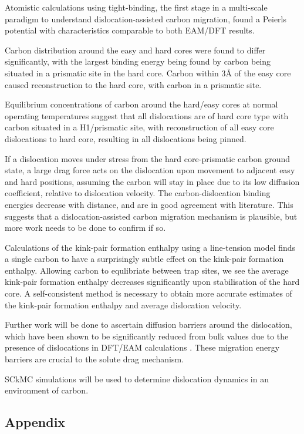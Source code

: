 \documentclass[a4paper,11pt]{article}
\numberwithin{equation}{chapter}
\numberwithin{listing}{chapter}
\begin{document}
Atomistic calculations using tight-binding, the first stage in a multi-scale paradigm to
understand dislocation-assisted carbon migration, found a Peierls potential with characteristics
comparable to both EAM/DFT results.

Carbon distribution around the easy and hard cores were found to differ
significantly, with the largest binding energy being found by carbon being situated in a prismatic
site in the hard core. Carbon within 3\AA{} of the easy core caused reconstruction to the hard core,
with carbon in a prismatic site.

Equilibrium concentrations of carbon around the hard/easy cores at normal operating temperatures
suggest that all dislocations are of hard core type with carbon situated in a H1/prismatic site, with
reconstruction of all easy core dislocations to hard core, resulting in all dislocations being
pinned.

If a dislocation moves under stress from the hard core-prismatic carbon ground state, a large drag
force acts on the dislocation upon movement to adjacent easy and hard positions, assuming the carbon
will stay in place due to its low diffusion coefficient, relative to dislocation velocity. The
carbon-dislocation binding energies decrease with distance, and are in good agreement with
literature. This suggests that a dislocation-assisted carbon migration mechanism is plausible, but
more work needs to be done to confirm if so.

Calculations of the kink-pair formation enthalpy using a line-tension model finds a
single carbon to have a surprisingly subtle effect on the kink-pair formation
enthalpy. Allowing carbon to equlibriate between trap sites, we see the average
kink-pair formation enthalpy decreases significantly upon stabilisation of the hard
core. A self-consistent method is necessary to obtain more accurate estimates of the
kink-pair formation enthalpy and average dislocation velocity.

Further work will be done to ascertain diffusion barriers around the dislocation, which have been
shown to be significantly reduced from bulk values due to the presence of dislocations in DFT/EAM
calculations \cite{Nematollahi2016}. These migration energy barriers are crucial to the solute drag mechanism.

SCkMC simulations will be used to determine dislocation dynamics in an environment of carbon.


\subsection{Appendix}
\label{sec:org6e5f268}
\end{document}
